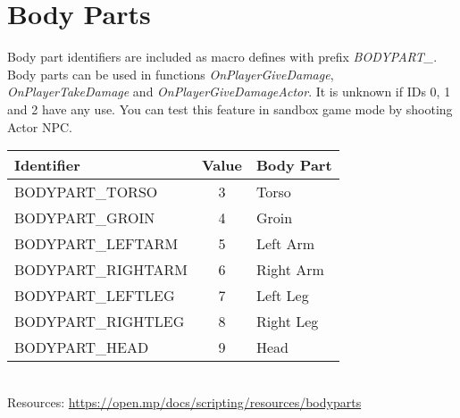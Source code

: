 \documentclass{article}
\begin{document}
\newpage
\section{Body Parts}
\begin{sloppypar}
Body part identifiers are included as macro defines with prefix \textit{BODYPART\_}. Body parts can be used in functions \textit{OnPlayerGiveDamage}, \textit{OnPlayerTakeDamage} and \textit{OnPlayerGiveDamageActor}. It is unknown if IDs 0, 1 and 2 have any use. You can test this feature in sandbox game mode by shooting Actor NPC.
\end{sloppypar}
\bigskip
\noindent\begin{tabular}{ |l|c|l| } 
\hline
Identifier & Value & Body Part \\
\hline
BODYPART\_TORSO & 3 & Torso \\ 
BODYPART\_GROIN & 4 & Groin \\
BODYPART\_LEFTARM & 5 & Left Arm \\
BODYPART\_RIGHTARM & 6 & Right Arm \\
BODYPART\_LEFTLEG & 7 & Left Leg \\
BODYPART\_RIGHTLEG & 8 & Right Leg \\
BODYPART\_HEAD & 9 & Head \\
\hline
\end{tabular}
\bigskip
\\Resources: \url{https://open.mp/docs/scripting/resources/bodyparts}
\end{document}
